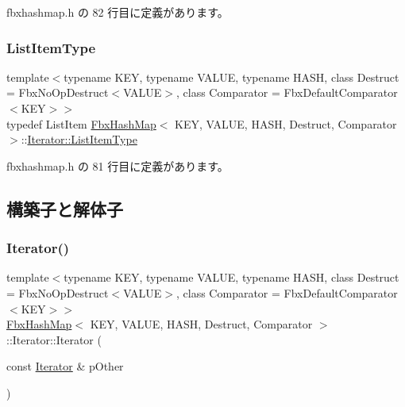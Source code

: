  fbxhashmap.\+h の 82 行目に定義があります。

\mbox{\label{class_fbx_hash_map_1_1_iterator_a586b3cba7926b5b3cc39b9f581fdeb3f}} 
\subsubsection{\texorpdfstring{List\+Item\+Type}{ListItemType}}
{\footnotesize\ttfamily template$<$typename K\+EY, typename V\+A\+L\+UE, typename H\+A\+SH, class Destruct = Fbx\+No\+Op\+Destruct$<$\+V\+A\+L\+U\+E$>$, class Comparator = Fbx\+Default\+Comparator$<$\+K\+E\+Y$>$$>$ \\
typedef List\+Item \hyperlink{class_fbx_hash_map}{Fbx\+Hash\+Map}$<$ K\+EY, V\+A\+L\+UE, H\+A\+SH, Destruct, Comparator $>$\+::\hyperlink{class_fbx_hash_map_1_1_iterator_a586b3cba7926b5b3cc39b9f581fdeb3f}{Iterator\+::\+List\+Item\+Type}}



 fbxhashmap.\+h の 81 行目に定義があります。



\subsection{構築子と解体子}
\mbox{\label{class_fbx_hash_map_1_1_iterator_a481aed412a6d384dfc6757d6f95e7b23}} 
\subsubsection{\texorpdfstring{Iterator()}{Iterator()}}
{\footnotesize\ttfamily template$<$typename K\+EY, typename V\+A\+L\+UE, typename H\+A\+SH, class Destruct = Fbx\+No\+Op\+Destruct$<$\+V\+A\+L\+U\+E$>$, class Comparator = Fbx\+Default\+Comparator$<$\+K\+E\+Y$>$$>$ \\
\hyperlink{class_fbx_hash_map}{Fbx\+Hash\+Map}$<$ K\+EY, V\+A\+L\+UE, H\+A\+SH, Destruct, Comparator $>$\+::Iterator\+::\+Iterator (\begin{DoxyParamCaption}\item[{const \hyperlink{class_fbx_hash_map_1_1_iterator}{Iterator} \&}]{p\+Other }\end{DoxyParamCaption})\hspace{0.3cm}{\ttfamily [inline]}}


